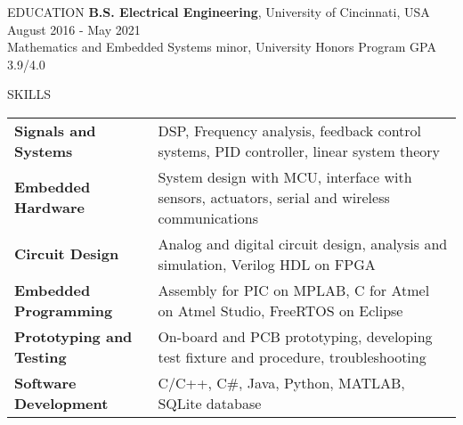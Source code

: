 \documentclass{../lib/resume} %
\begin{document}

    \begin{rSection}{EDUCATION}
        {\bf B.S. Electrical Engineering}, University of Cincinnati, USA \hfill {August 2016 - May 2021}\\
        Mathematics and Embedded Systems minor, University Honors Program \hfill {GPA 3.9/4.0}




    \end{rSection}

    \begin{rSection}{SKILLS}

        \begin{tabular}{ @{} >{\bfseries}l @{\hspace{2ex}} l }
            Signals and Systems & DSP, Frequency analysis, feedback control systems, PID controller, linear system theory	\\
            Embedded Hardware & System design with MCU, interface with sensors, actuators, serial and wireless communications \\
            Circuit Design & Analog and digital circuit design, analysis and simulation, Verilog HDL on FPGA \\
            Embedded Programming & Assembly for PIC on MPLAB, C for Atmel on Atmel Studio, FreeRTOS on Eclipse \\
            Prototyping and Testing &  On-board and PCB prototyping, developing test fixture and procedure, troubleshooting	\\
            Software Development & C/C++, C\#, Java, Python, MATLAB, SQLite database \\
        \end{tabular}
    \end{rSection}
\end{document}
